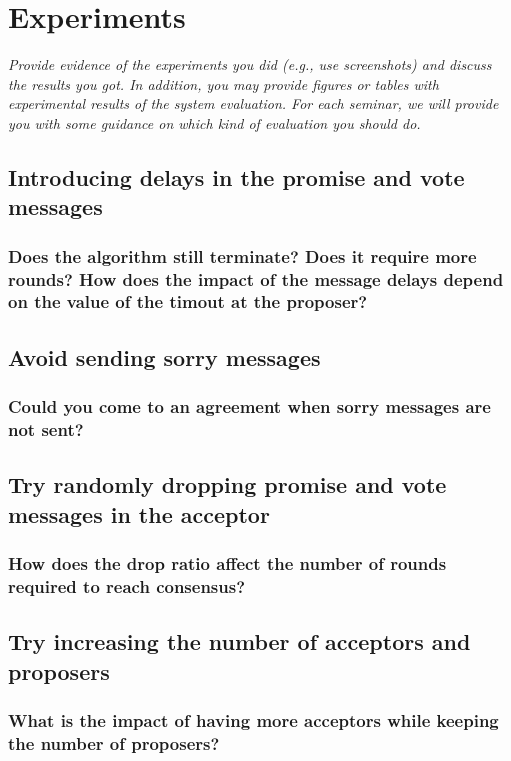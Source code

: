 \documentclass[a4paper, 10pt]{article}
\begin{document}
\section{Experiments}
\textit{Provide evidence of the experiments you did (e.g., use screenshots) and discuss the results you got. In addition, you may provide figures or tables with experimental results of the system evaluation. For each seminar, we will provide you with some guidance on which kind of evaluation you should do.}

\subsection{Introducing delays in the promise and vote messages}

\subsubsection{Does the algorithm still terminate? Does it require more rounds? How does the impact of the message delays depend on the value of the timout at the proposer?}

\subsection{Avoid sending sorry messages}

\subsubsection{Could you come to an agreement when sorry messages are not sent?}

\subsection{Try randomly dropping promise and vote messages in the acceptor}

\subsubsection{How does the drop ratio affect the number of rounds required to reach consensus?}

\subsection{Try increasing the number of acceptors and proposers}

\subsubsection{What is the impact of having more acceptors while keeping the number of proposers?}
\end{document}
